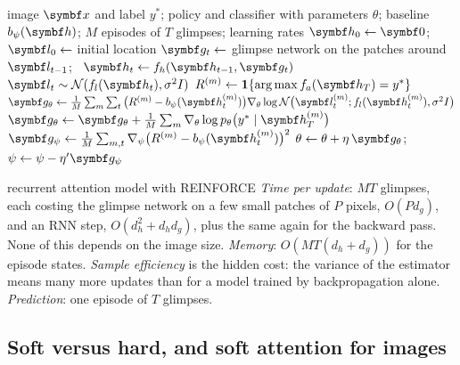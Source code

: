 \documentclass[11pt]{article}
\newcommand{\hv}{\vect{h}}
\newcommand{\gv}{\vect{g}}
\begin{document}
\begin{algorithm}[htbp]
\caption{REINFORCE with a baseline for a recurrent attention model}\label{alg:reinforce}
\begin{algorithmic}[1]
\Require image $\x$ and label $y^*$; policy and classifier with parameters $\theta$; baseline $b_\psi(\hv)$; $M$ episodes of
  $T$ glimpses; learning rates
    \State $\hv_0 \gets \vect{0}$; \ $\vect{l}_0 \gets$ initial location
      \State $\vect{g}_t \gets$ glimpse network on the patches around $\vect{l}_{t-1}$; \ $\hv_t \gets f_h(\hv_{t-1}, \vect{g}_t)$
      \State $\vect{l}_t \sim \Normal(f_l(\hv_t), \sigma^2 I)$ 
    \EndFor
    \State $R^{(m)} \gets \ind{\argmax f_a(\hv_T) = y^*}$ 
  \EndFor
  \State $\gv_\theta \gets \frac1M\sum_{m}\sum_{t}\big(R^{(m)} - b_\psi(\hv^{(m)}_t)\big)\nabla_\theta\log\Normal\big(\vect{l}^{(m)}_t; f_l(\hv^{(m)}_t), \sigma^2 I\big)$
  \State $\gv_\theta \gets \gv_\theta + \frac1M\sum_m\nabla_\theta\log p_\theta\big(y^* \mid \hv_T^{(m)}\big)$ 
  \State $\gv_\psi \gets \frac1M\sum_{m,t}\nabla_\psi\big(R^{(m)} - b_\psi(\hv_t^{(m)})\big)^2$ 
  \State $\theta \gets \theta + \eta\,\gv_\theta$; \ $\psi \gets \psi - \eta'\gv_\psi$ 
\EndFunction
\end{algorithmic}
\end{algorithm}

\begin{runtime}{recurrent attention model with REINFORCE}
\emph{Time per update}: $MT$ glimpses, each costing the glimpse network on a few small patches of $P$ pixels, $O(Pd_g)$, and
an RNN step, $O(d_h^2 + d_hd_g)$, plus the same again for the backward pass. None of this depends on the image size. \emph{Memory}: $O(MT(d_h + d_g))$ for the episode
states. \emph{Sample efficiency} is the hidden cost: the variance of the estimator means many more updates than for a
model trained by backpropagation alone. \emph{Prediction}: one episode of $T$ glimpses.
\end{runtime}

\subsection{Soft versus hard, and soft attention for images}\label{sec:softhard}
\end{document}

